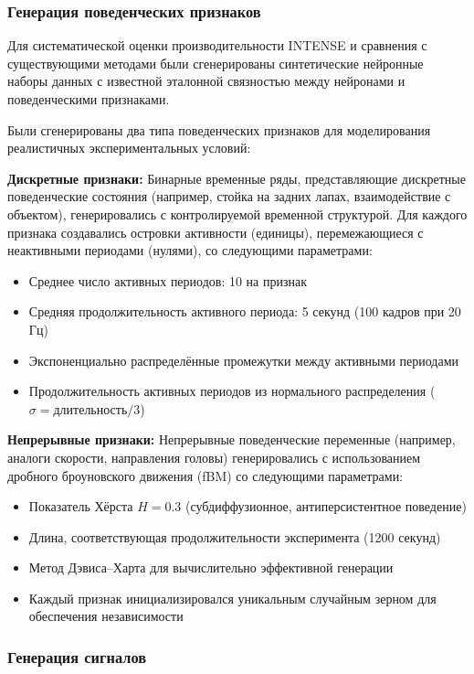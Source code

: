\subsubsection{Генерация поведенческих признаков}
\label{sec:synthetic_data_generation}

Для систематической оценки производительности INTENSE и сравнения с существующими методами
были сгенерированы синтетические нейронные наборы данных с известной эталонной связностью между нейронами и поведенческими признаками.

Были сгенерированы два типа поведенческих признаков для моделирования реалистичных экспериментальных
условий:

\textbf{Дискретные признаки:} Бинарные временные ряды, представляющие дискретные поведенческие
состояния (например, стойка на задних лапах, взаимодействие с объектом), генерировались с контролируемой временной
структурой. Для каждого признака создавались островки активности (единицы), перемежающиеся с
неактивными периодами (нулями), со следующими параметрами:
\begin{itemize}
\item Среднее число активных периодов: 10 на признак
\item Средняя продолжительность активного периода: 5 секунд (100 кадров при 20 Гц)
\item Экспоненциально распределённые промежутки между активными периодами
\item Продолжительность активных периодов из нормального распределения ($\sigma =
\text{длительность}/3$)
\end{itemize}

\textbf{Непрерывные признаки:} Непрерывные поведенческие переменные (например, аналоги скорости, направления
головы) генерировались с использованием дробного броуновского движения (fBM) со следующими параметрами:
\begin{itemize}
\item Показатель Хёрста $H = 0.3$ (субдиффузионное, антиперсистентное поведение)
\item Длина, соответствующая продолжительности эксперимента (1200 секунд)
\item Метод Дэвиса--Харта для вычислительно эффективной генерации
\item Каждый признак инициализировался уникальным случайным зерном для обеспечения независимости
\end{itemize}

\subsubsection{Генерация сигналов}
\label{sec:signal_generation}

